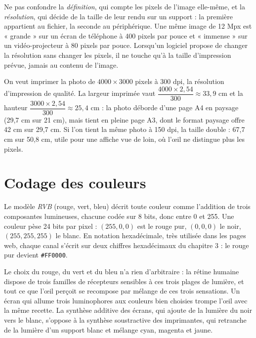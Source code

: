 \begin{attention}
Ne pas confondre la \emph{définition}, qui compte les pixels de l'image elle-même, et la \emph{résolution}, qui décide de la taille de leur rendu sur un support : la première appartient au fichier, la seconde au périphérique. Une même image de 12 Mpx est « grande » sur un écran de téléphone à 400 pixels par pouce et « immense » sur un vidéo-projecteur à 80 pixels par pouce. Lorsqu'un logiciel propose de changer la résolution sans changer les pixels, il ne touche qu'à la taille d'impression prévue, jamais au contenu de l'image.
\end{attention}

\begin{exemple}
On veut imprimer la photo de $4000 \times 3000$ pixels à 300 dpi, la résolution d'impression de qualité. La largeur imprimée vaut $\dfrac{4000 \times 2{,}54}{300} \approx 33{,}9$ cm et la hauteur $\dfrac{3000 \times 2{,}54}{300} \approx 25{,}4$ cm : la photo déborde d'une page A4 en paysage (29{,}7 cm sur 21 cm), mais tient en pleine page A3, dont le format paysage offre 42 cm sur 29{,}7 cm. Si l'on tient la même photo à 150 dpi, la taille double : 67{,}7 cm sur 50{,}8 cm, utile pour une affiche vue de loin, où l'œil ne distingue plus les pixels.
\end{exemple}

\section{Codage des couleurs}

\begin{definition}
Le modèle \emph{RVB} (rouge, vert, bleu) décrit toute couleur comme l'addition de trois composantes lumineuses, chacune codée sur 8 bits, donc entre 0 et 255. Une couleur pèse 24 bits par pixel : $(255, 0, 0)$ est le rouge pur, $(0, 0, 0)$ le noir, $(255, 255, 255)$ le blanc. En notation hexadécimale, très utilisée dans les pages web, chaque canal s'écrit sur deux chiffres hexadécimaux du chapitre 3 : le rouge pur devient \texttt{\#FF0000}.
\end{definition}

Le choix du rouge, du vert et du bleu n'a rien d'arbitraire : la rétine humaine dispose de trois familles de récepteurs sensibles à ces trois plages de lumière, et tout ce que l'œil perçoit se recompose par mélange de ces trois sensations. Un écran qui allume trois luminophores aux couleurs bien choisies trompe l'œil avec la même recette. La synthèse additive des écrans, qui ajoute de la lumière du noir vers le blanc, s'oppose à la synthèse soustractive des imprimantes, qui retranche de la lumière d'un support blanc et mélange cyan, magenta et jaune.

